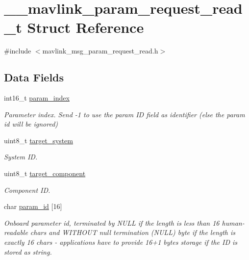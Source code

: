\hypertarget{struct____mavlink__param__request__read__t}{\section{\+\_\+\+\_\+mavlink\+\_\+param\+\_\+request\+\_\+read\+\_\+t Struct Reference}
\label{struct____mavlink__param__request__read__t}
}


{\ttfamily \#include $<$mavlink\+\_\+msg\+\_\+param\+\_\+request\+\_\+read.\+h$>$}

\subsection*{Data Fields}
\begin{DoxyCompactItemize}
\item 
int16\+\_\+t \hyperlink{struct____mavlink__param__request__read__t_aef0bfa3c1d8457e0b417fa87b31f3c22}{param\+\_\+index}
\begin{DoxyCompactList}\small\item\em Parameter index. Send -\/1 to use the param I\+D field as identifier (else the param id will be ignored) \end{DoxyCompactList}\item 
uint8\+\_\+t \hyperlink{struct____mavlink__param__request__read__t_adc4407f944beba256a385768ea61e588}{target\+\_\+system}
\begin{DoxyCompactList}\small\item\em System I\+D. \end{DoxyCompactList}\item 
uint8\+\_\+t \hyperlink{struct____mavlink__param__request__read__t_aa865f64059877480b11a2f476d1a8ca4}{target\+\_\+component}
\begin{DoxyCompactList}\small\item\em Component I\+D. \end{DoxyCompactList}\item 
char \hyperlink{struct____mavlink__param__request__read__t_aa8ffcf4369a38e0a04cc0252ec13b54e}{param\+\_\+id} \mbox{[}16\mbox{]}
\begin{DoxyCompactList}\small\item\em Onboard parameter id, terminated by N\+U\+L\+L if the length is less than 16 human-\/readable chars and W\+I\+T\+H\+O\+U\+T null termination (N\+U\+L\+L) byte if the length is exactly 16 chars -\/ applications have to provide 16+1 bytes storage if the I\+D is stored as string. \end{DoxyCompactList}\end{DoxyCompactItemize}


